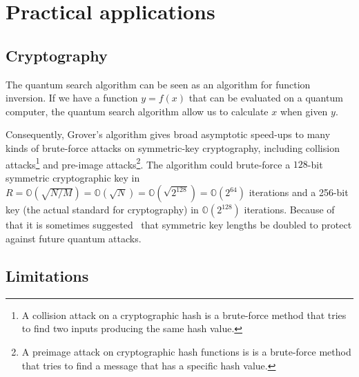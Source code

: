 \section{Practical applications}
\subsection{Cryptography}
The quantum search algorithm can be seen as an algorithm for function inversion. If we have a function $y=f(x)$ that can be evaluated on a quantum computer, the quantum search algorithm allow us to calculate $x$ when given $y$.

Consequently, Grover's algorithm gives broad asymptotic speed-ups to many kinds of brute-force attacks on symmetric-key cryptography, including collision attacks\footnote{A collision attack on a cryptographic hash is a brute-force method that tries to find two inputs producing the same hash value.} and pre-image attacks\footnote{A preimage attack on cryptographic hash functions is is a brute-force method that tries to find a message that has a specific hash value.}.
The algorithm could brute-force a $128$-bit symmetric cryptographic key in $R = \mathbb{O} (\sqrt{N/M}) = \mathbb{O} (\sqrt{N}) = \mathbb{O} (\sqrt{2^{128}}) = \mathbb{O} (2^{64})$ iterations and a 256-bit key (the actual standard for cryptography) in $\mathbb{O} (2^{128})$ iterations. Because of that  it is sometimes suggested~\cite{10.1007/978-3-642-12929-2_6} that symmetric key lengths be doubled to protect against future quantum attacks.

\subsection{Limitations}

